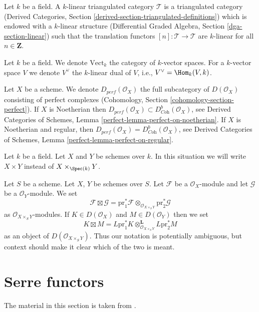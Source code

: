 \noindent
Let $k$ be a field. A $k$-linear triangulated category $\mathcal{T}$
is a triangulated category (Derived Categories, Section
\ref{derived-section-triangulated-definitions})
which is endowed with a $k$-linear structure
(Differential Graded Algebra, Section \ref{dga-section-linear})
such that the translation functors $[n] : \mathcal{T} \to \mathcal{T}$
are $k$-linear for all $n \in \mathbf{Z}$.

\medskip\noindent
Let $k$ be a field. We denote $\text{Vect}_k$ the category of
$k$-vector spaces. For a $k$-vector space $V$ we denote
$V^\vee$ the $k$-linear dual of $V$, i.e., $V^\vee = \Hom_k(V, k)$.

\medskip\noindent
Let $X$ be a scheme. We denote $D_{perf}(\mathcal{O}_X)$ the full
subcategory of $D(\mathcal{O}_X)$ consisting of perfect complexes
(Cohomology, Section \ref{cohomology-section-perfect}).
If $X$ is Noetherian then
$D_{perf}(\mathcal{O}_X) \subset D^b_{\textit{Coh}}(\mathcal{O}_X)$, see
Derived Categories of Schemes, Lemma \ref{perfect-lemma-perfect-on-noetherian}.
If $X$ is Noetherian and regular, then
$D_{perf}(\mathcal{O}_X) = D^b_{\textit{Coh}}(\mathcal{O}_X)$, see
Derived Categories of Schemes, Lemma \ref{perfect-lemma-perfect-on-regular}.

\medskip\noindent
Let $k$ be a field. Let $X$ and $Y$ be schemes over $k$. In this
situation we will write $X \times Y$ instead of $X \times_{\Spec(k)} Y$.


\medskip\noindent
Let $S$ be a scheme. Let $X$, $Y$ be schemes over $S$.
Let $\mathcal{F}$ be a $\mathcal{O}_X$-module and let
$\mathcal{G}$ be a $\mathcal{O}_Y$-module. We set
$$
\mathcal{F} \boxtimes \mathcal{G} =
\text{pr}_1^*\mathcal{F} \otimes_{\mathcal{O}_{X \times_S Y}}
\text{pr}_2^*\mathcal{G}
$$
as $\mathcal{O}_{X \times_S Y}$-modules.
If $K \in D(\mathcal{O}_X)$ and $M \in D(\mathcal{O}_Y)$ then we set
$$
K \boxtimes M =
L\text{pr}_1^*K \otimes_{\mathcal{O}_{X \times_S Y}}^\mathbf{L} L\text{pr}_2^*M
$$
as an object of $D(\mathcal{O}_{X \times_S Y})$.
Thus our notation is potentially ambiguous, but context should make it clear
which of the two is meant.





\section{Serre functors}
\label{section-Serre-functors}

\noindent
The material in this section is taken from \cite{Bondal-Kapranov}.

